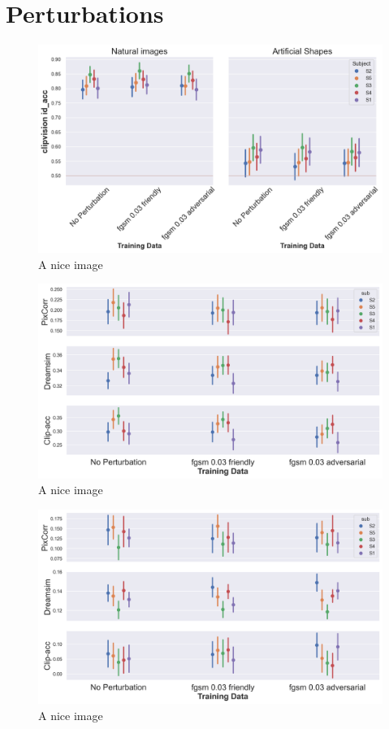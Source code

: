 \section{Perturbations}
\begin{figure}[ht]
    \centering
    \includegraphics[width=1\textwidth]{plots/advpert_translator_fgsm_0.03.png}
    \caption{A nice image}\label{fig:advpert_translator_fgsm_0}
\end{figure}


\begin{figure}[ht]
    \centering
    \includegraphics[width=1\textwidth]{plots/advpert_reconstruction_test_fgsm_0.03.png}
    \caption{A nice image}\label{fig:advpert_reconstruction_test_fgsm_0.03}
\end{figure}

\begin{figure}[ht]
    \centering
    \includegraphics[width=1\textwidth]{plots/advpert_reconstruction_art_fgsm_0.03.png}
    \caption{A nice image}\label{fig:advpert_reconstruction_art_fgsm_0.03}
\end{figure}


